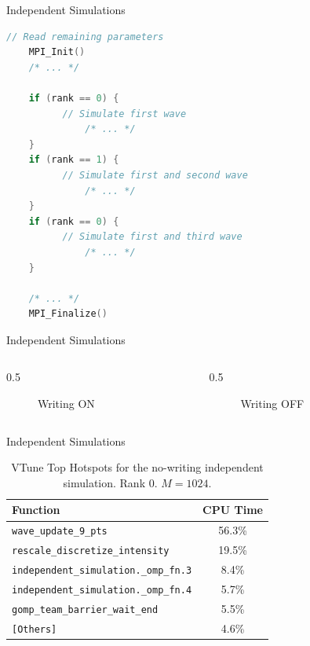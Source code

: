 \documentclass[11pt,aspectratio=169]{beamer}
\begin{document}
\begin{frame}[fragile]{Independent Simulations}
  \scriptsize
\begin{lstlisting}[language=C]
    // Read remaining parameters
    MPI_Init()
    /* ... */

    if (rank == 0) {
          // Simulate first wave
              /* ... */
    }
    if (rank == 1) {
          // Simulate first and second wave
              /* ... */
    }
    if (rank == 0) {
          // Simulate first and third wave
              /* ... */
    }

    /* ... */
    MPI_Finalize()
\end{lstlisting}
\end{frame}

\begin{frame}{Independent Simulations}
  \begin{columns}
    \begin{column}{0.5\textwidth}
      \begin{figure}
        \centering
        \scalebox{0.7}{}
        \caption{Writing ON}
      \end{figure}

    \end{column}

    \begin{column}{0.5\textwidth}
      \begin{figure}
        \centering
        \scalebox{0.7}{}
        \caption{Writing OFF}

      \end{figure}

    \end{column}
  \end{columns}

\end{frame}

\begin{frame}{Independent Simulations}
  \begin{table}[h]
    \centering
    \small
    \begin{tabular}{lc}
      \toprule
      Function & CPU Time \\
      \midrule
      \texttt{wave\_update\_9\_pts} & 56.3\% \\
      \texttt{rescale\_discretize\_intensity} & 19.5\% \\
      \texttt{independent\_simulation.\_omp\_fn.3} & 8.4\% \\
      \texttt{independent\_simulation.\_omp\_fn.4} & 5.7\% \\
      \texttt{gomp\_team\_barrier\_wait\_end} & 5.5\% \\
      \texttt{[Others]} & 4.6\% \\
      \bottomrule
    \end{tabular}
    \caption{VTune Top Hotspots for the
    no-writing independent simulation. Rank 0. $M = 1024$.}
    \label{tab:vtune_hotspots_independent}
  \end{table}
\end{frame}
\end{document}
